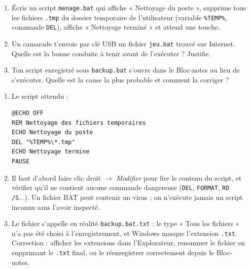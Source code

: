\documentclass[11pt]{article}
\begin{document}
\begin{exercice}
\begin{enumerate}
  \item Écris un script \texttt{menage.bat} qui affiche « Nettoyage du poste », supprime tous les fichiers \texttt{.tmp} du dossier temporaire de l'utilisateur (variable \texttt{\%TEMP\%}, commande \texttt{DEL}), affiche « Nettoyage terminé » et attend une touche.
  \item Un camarade t'envoie par clé USB un fichier \texttt{jeu.bat} trouvé sur Internet. Quelle est la bonne conduite à tenir avant de l'exécuter ? Justifie.
  \item Ton script enregistré sous \texttt{backup.bat} s'ouvre dans le Bloc-notes au lieu de s'exécuter. Quelle est la cause la plus probable et comment la corriger ?
\end{enumerate}
\end{exercice}

\begin{corrige}[Exercice]
\begin{enumerate}
  \item Le script attendu :
\begin{lstlisting}
@ECHO OFF
REM Nettoyage des fichiers temporaires
ECHO Nettoyage du poste
DEL "%TEMP%\*.tmp"
ECHO Nettoyage termine
PAUSE
\end{lstlisting}
  \item Il faut d'abord faire clic droit $\rightarrow$ \emph{Modifier} pour lire le contenu du script, et vérifier qu'il ne contient aucune commande dangereuse (\texttt{DEL}, \texttt{FORMAT}, \texttt{RD /S}...). Un fichier BAT peut contenir un virus ; on n'exécute jamais un script inconnu sans l'avoir inspecté.
  \item Le fichier s'appelle en réalité \texttt{backup.bat.txt} : le type « Tous les fichiers » n'a pas été choisi à l'enregistrement, et Windows masque l'extension \texttt{.txt}. Correction : afficher les extensions dans l'Explorateur, renommer le fichier en supprimant le \texttt{.txt} final, ou le réenregistrer correctement depuis le Bloc-notes.
\end{enumerate}
\end{corrige}
\end{document}
